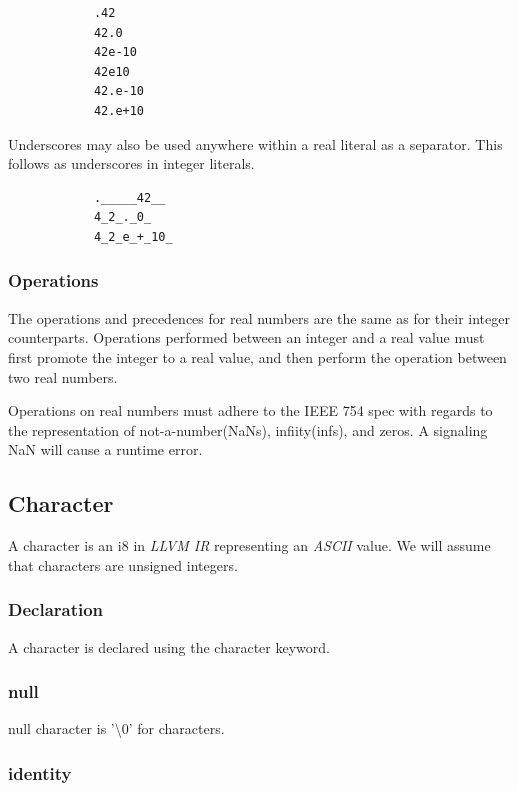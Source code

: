 \documentclass{article}
\begin{document}
		\begin{lstlisting}
			.42
			42.0
			42e-10
			42e10
			42.e-10
			42.e+10
		\end{lstlisting}

		Underscores may also be used anywhere within a real literal as a separator.  This follows as underscores in
		integer literals.

		\begin{lstlisting}
			._____42__
			4_2_._0_
			4_2_e_+_10_
		\end{lstlisting}

	\subsubsection{Operations}

		The operations and precedences for real numbers are the same as for their integer counterparts. Operations
		performed between an integer and a real value must first promote the integer to a real value, and then perform
		the operation between two real numbers.

		Operations on real numbers must adhere to the \textsf{IEEE 754} spec with regards to the representation of
		not-a-number(NaNs), infiity(infs), and zeros. A signaling NaN will cause a runtime error.


	\subsection{Character}\label{sec:character}

		A character is an \textsf{i8} in \textit{LLVM IR} representing an \textit{ASCII} value. We will assume that
		characters are unsigned integers.

	\subsubsection{Declaration}

		A character is declared using the \textsf{character} keyword.

	\subsubsection{null}

		\textsf{null} character is \textsf{'\textbackslash0'} for characters.

	\subsubsection{identity}
\end{document}
